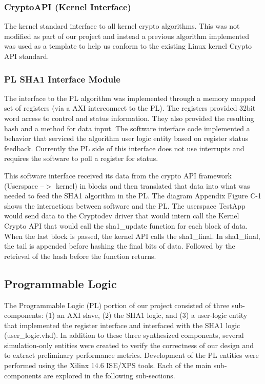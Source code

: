 \documentclass[journal]{IEEEtran}
\begin{document}
\subsubsection{CryptoAPI (Kernel Interface)}
The kernel standard interface to all kernel crypto algorithms.  This was not modified as part of our project and instead a previous algorithm implemented was used as a template to help us conform to the existing Linux kernel Crypto API standard.
\subsubsection{PL SHA1 Interface Module}
The interface to the PL algorithm was implemented through a memory mapped set of registers (via a AXI interconnect to the PL).  The registers provided 32bit word access to control and status information.  They also provided the resulting hash and a method for data input.  The software interface code implemented a behavior that serviced the algorithm user logic entity based on register status feedback.  Currently the PL side of this interface does not use interrupts and requires the software to poll a register for status. 
 
This software interface received its data from the crypto API framework (Userspace --$>$ kernel) in blocks and then translated that data into what was needed to feed the SHA1 algorithm in the PL.  The diagram Appendix Figure C-1 shows the interactions between software and the PL.  The userspace TestApp would send data to the Cryptodev driver that would intern call the Kernel Crypto API that would call the sha1\_update function for each block of data.  When the last block is passed, the kernel API calls the sha1\_final.  In sha1\_final, the tail is appended before hashing the final bits of data.  Followed by the retrieval of the hash before the function returns.  
\subsection{Programmable Logic}
The Programmable Logic (PL) portion of our project consisted of three sub-components: (1) an AXI slave, (2) the SHA1 logic, and (3) a user-logic entity that implemented the register interface and interfaced with the SHA1 logic (user\_logic.vhd).  In addition to these three synthesized components, several simulation-only entities were created to verify the correctness of our design and to extract preliminary performance metrics.
Development of the PL entities were performed using the Xilinx 14.6 ISE/XPS tools.
Each of the main sub-components are explored in the following sub-sections.
\end{document}
